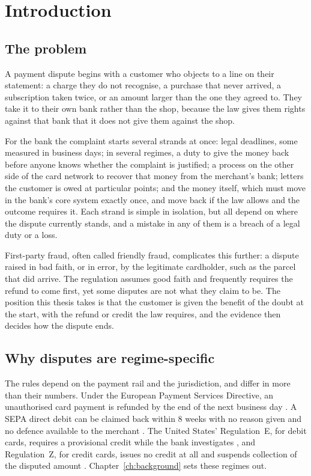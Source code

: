\chapter{Introduction}
\label{ch:introduction}


\section{The problem}
\label{sec:intro-problem}

A payment dispute begins with a customer who objects to a line on their statement: a charge they
do not recognise, a purchase that never arrived, a subscription taken twice, or an amount larger
than the one they agreed to. They take it to their own bank rather than the shop, because the law
gives them rights against that bank that it does not give them against the shop.

For the bank the complaint starts several strands at once: legal deadlines, some measured in
business days; in several regimes, a duty to give the money back before anyone knows whether the
complaint is justified; a process on the other side of the card network to recover that money
from the merchant's bank; letters the customer is owed at particular points; and the money itself,
which must move in the bank's core system exactly once, and move back if the law allows and the
outcome requires it. Each strand is simple in isolation, but all depend on where the dispute
currently stands, and a mistake in any of them is a breach of a legal duty or a loss.

First-party fraud, often called friendly fraud, complicates this further: a dispute raised in bad
faith, or in error, by the legitimate cardholder, such as the parcel that did arrive. The
regulation assumes good faith and frequently requires the refund to come first, yet some disputes
are not what they claim to be. The position this thesis takes is that the customer is
given the benefit of the doubt at the start, with the refund or credit the law requires, and the
evidence then decides how the dispute ends.

\section{Why disputes are regime-specific}
\label{sec:intro-regimes}

The rules depend on the payment rail and the jurisdiction, and differ in more than their numbers.
Under the European Payment Services Directive, an unauthorised card payment is refunded by the end
of the next business day \cite{psd2}. A SEPA direct debit can be claimed back within 8 weeks
with no reason given and no defence available to the merchant \cite{sepacore}. The United States'
Regulation~E, for debit cards, requires a provisional credit while the bank investigates
\cite{rege}, and Regulation~Z, for credit cards, issues no credit at all and suspends collection of
the disputed amount \cite{regz}. Chapter~\ref{ch:background} sets these regimes out.


